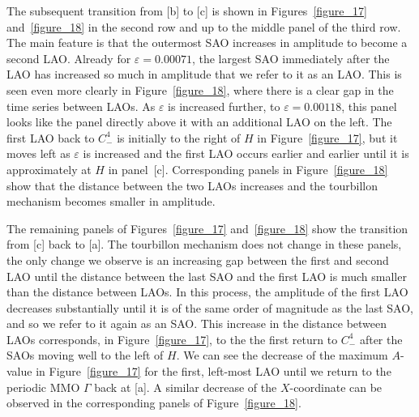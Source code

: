 \documentclass{ws-ijbc}
\begin{document}
The subsequent transition from [b] to [c] is shown in Figures~\ref{figure_17} and~\ref{figure_18} in the second row and up to the middle panel of the third row.  The main feature is that the outermost SAO increases in amplitude to become a second LAO.  Already for $\varepsilon=0.00071$, the largest SAO immediately after the LAO has increased so much in amplitude that we refer to it as an LAO.  This is seen even more clearly in Figure~\ref{figure_18}, where there is a clear gap in the time series between LAOs.  As $\varepsilon$ is increased further, to $\varepsilon=0.00118$, this panel looks like the panel directly above it with an additional LAO on the left.  The first LAO back to $C^4_-$ is initially to the right of $H$ in Figure~\ref{figure_17}, but it moves left as $\varepsilon$ is increased and the first LAO occurs earlier and earlier until it is approximately at $H$ in panel~[c].  Corresponding panels in Figure~\ref{figure_18} show that the distance between the two LAOs increases and the tourbillon mechanism becomes smaller in amplitude.

The remaining panels of Figures~\ref{figure_17} and~\ref{figure_18} show the transition from [c] back to [a].  The tourbillon mechanism does not change in these panels, the only change we observe is an increasing gap between the first and second LAO until the distance between the last SAO and the first LAO is much smaller than the distance between LAOs.  In this process, the amplitude of the first LAO decreases substantially until it is of the same order of magnitude as the last SAO, and so we refer to it again as an SAO.  This increase in the distance between LAOs corresponds, in Figure~\ref{figure_17}, to the the first return to $C^4_-$ after the SAOs moving well to the left of $H$.  We can see the decrease of the maximum $A$-value in Figure~\ref{figure_17} for the first, left-most LAO until we return to the periodic MMO $\Gamma$ back at [a].  A similar decrease of the $X$-coordinate can be observed in the corresponding panels of Figure~\ref{figure_18}.
\end{document}
